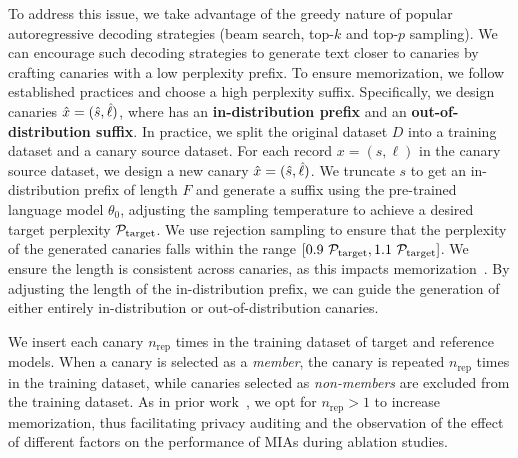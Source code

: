 To address this issue, we take advantage of the greedy nature of popular autoregressive decoding strategies (\eg beam search, top-$k$ and top-$p$ sampling).
%
We can encourage such decoding strategies to generate text closer to canaries by crafting canaries with a low perplexity prefix.
To ensure memorization, we follow established practices and choose a high perplexity suffix.
Specifically, we design canaries ${\hat{x}} = ({\hat{s}}, {\hat{\ell}})$, where  has an \textbf{in-distribution prefix} and an \textbf{out-of-distribution suffix}.
%
In practice, we split the original dataset $D$ into a training dataset and a canary source dataset.
For each record $x = (s, \ell)$ in the canary source dataset, we design a new canary ${\hat{x}} = ({\hat{s}}, {\hat{\ell}})$. We truncate $s$ to get an in-distribution prefix of length $F$ and generate a suffix using the pre-trained language model $\theta_0$, adjusting the sampling temperature to achieve a desired target perplexity $\mathcal{P}_{\textnormal{target}}$.
We use rejection sampling to ensure that the perplexity of the generated canaries falls within the range $[0.9 ~ \mathcal{P}_{\textnormal{target}}, 1.1 ~ \mathcal{P}_{\textnormal{target}} ]$.
We ensure the length is consistent across canaries, as this impacts memorization~\citep{carlini2022quantifying,kandpal2022deduplicating}.
By adjusting the length of the in-distribution prefix, we can guide the generation of either entirely in-distribution or out-of-distribution canaries.

We insert each canary $n_{\text{rep}}$ times in the training dataset of target and reference models.
When a canary is selected as a \emph{member}, the canary is repeated $n_{\text{rep}}$ times in the training dataset, while canaries selected as \emph{non-members} are excluded from the training dataset.
As in prior work~\citep{carlini2022quantifying,kandpal2022deduplicating,meeuscopyright}, we opt for $n_{\text{rep}} > 1$ to increase memorization, thus facilitating privacy auditing and the observation of the effect of different factors on the performance of MIAs during ablation studies.

